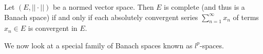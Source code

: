 \begin{theorem}
Let $(E, ||\cdot||)$ be a normed vector space.  Then $E$ is complete (and thus is a Banach space) if and only if each absolutely convergent series $\sum_{n=1}^\infty x_n$ of terms $x_n \in E$ is convergent in $E$.
\end{theorem}



We now look at a special family of Banach spaces known as $l^p$-spaces.

\begin{defn}

\end{defn}